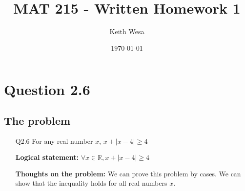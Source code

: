 \documentclass{article}
\author{Keith Wesa}
\title{MAT 215 - Written Homework 1}
\date{\today}
\begin{document}
\section*{Question 2.6}
\subsection*{The problem}
\begin{itemize}
    \item[Q2.6] For any real number $x$, $x + |x - 4| \geq 4$
    \item[] \textbf{Logical statement:} $\forall x \in \mathbb{R}, x + |x - 4| \geq 4$
    \item[] \textbf{Thoughts on the problem: } We can prove this problem by cases. We can show that the inequality holds for all real numbers $x$.
\end{itemize}
\end{document}
